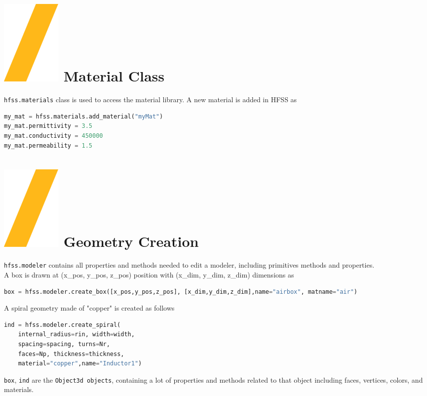 \documentclass[9pt,landscape]{article}
\begin{document}
\begin{multicols}{3}
\section{\includegraphics[height=\fontcharht\font`\S]{slash.png} Material Class}
\texttt{hfss.materials} class is used to access the material library. A new material is added in HFSS as
\begin{lstlisting}[language=Python]
my_mat = hfss.materials.add_material("myMat")
my_mat.permittivity = 3.5
my_mat.conductivity = 450000
my_mat.permeability = 1.5
\end{lstlisting}

\section{\includegraphics[height=\fontcharht\font`\S]{slash.png} Geometry Creation}
\texttt{hfss.modeler} contains all properties and methods needed to edit a modeler, including primitives methods and properties.
\newline
\\
A box is drawn at (x\_pos, y\_pos, z\_pos) position with (x\_dim, y\_dim, z\_dim) dimensions as
\begin{lstlisting}[language=Python]
box = hfss.modeler.create_box([x_pos,y_pos,z_pos], [x_dim,y_dim,z_dim],name="airbox", matname="air")
\end{lstlisting}
A spiral geometry made of "copper" is created as follows
\begin{lstlisting}[language=Python]
ind = hfss.modeler.create_spiral(
	internal_radius=rin, width=width,
	spacing=spacing, turns=Nr,
	faces=Np, thickness=thickness,
	material="copper",name="Inductor1")
\end{lstlisting}
\texttt{box}, \texttt{ind} are the \texttt{Object3d objects}, containing a lot of properties and methods related to that object including faces, vertices, colors, and materials.
\vfill
\columnbreak


\end{multicols}
\end{document}
